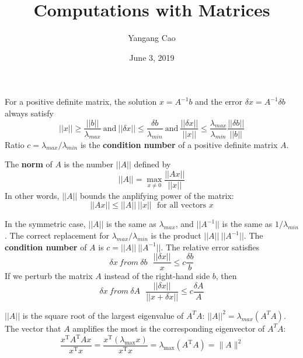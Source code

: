 \documentclass[10pt,a4paper,oneside]{article}
\author{Yangang Cao}
\date{June 3, 2019}
\begin{document}
\title{Computations with Matrices}
\maketitle 
For a positive definite matrix, the solution $x=A^{-1}b$ and the error $\delta x=A^{-1}\delta b$ always satisfy
\[
||x||\geqslant\frac{||b||}{\lambda_{max}}\ \text{and}\ ||\delta x||\leqslant\frac{\delta b}{\lambda_{min}}\ \text{and}\ \frac{||\delta x||}{||x||}\leqslant\frac{\lambda_{max}}{\lambda_{min}}\frac{||\delta b||}{||b||}
\]
Ratio $c=\lambda_{max}/\lambda_{min}$ is the {\bfseries condition number} of a positive definite matrix $A$.

The {\bfseries norm} of  $A$ is the number $||A||$ defined by
\[
||A||=\max_{x \not= 0}\frac{||Ax||}{||x||}
\]
In other words, $||A||$ bounds the anplifying power of the matrix:
\[
||Ax||\leqslant||A||\ ||x||\ \ \ \text{for all vectors $x$}
\]

In the symmetric case, $||A||$ is the same as $\lambda_{max}$, and $||A^{-1}||$ is the same as $1/\lambda_{min}$. The correct replacement for $\lambda_{max}/\lambda_{min}$ is the product $||A||\ ||A^{-1}||$. The {\bfseries condition number} of $A$ is $c=||A||\ ||A^{-1}||$. The relative error satisfies
\[
 \delta x\ from\ \delta b\ \ \ \frac{||\delta x||}{x}\leqslant c\frac{\delta b }{b}
\]
If we perturb the matrix $A$ instead of the right-hand side $b$, then
\[
\delta x\ from\ \delta A\ \ \ \frac{||\delta x||}{||x+\delta x||}\leqslant c\frac{\delta A }{A}
\]

$||A||$ is the square root of the largest eigenvalue of $A^TA$: $||A||^2=\lambda_{max}(A^TA)$. The vector that $A$ amplifies the most is the corresponding eigenvector of $A^TA$:
$$
\frac{x^{\mathrm{T}} A^{\mathrm{T}} A x}{x^{\mathrm{T}} x}=\frac{x^{\mathrm{T}}\left(\lambda_{\max } x\right)}{x^{\mathrm{T}} x}=\lambda_{\max }\left(A^{\mathrm{T}} A\right)=\|A\|^{2}
$$
\end{document}
